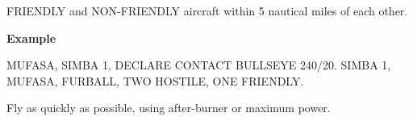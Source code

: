 \begin{tcoloritemize}
    \blueitem[FURBALL]
    FRIENDLY and NON-FRIENDLY aircraft within 5 nautical miles of each other.

    \medskip
    \textbf{Example}
    \begin{center}
        \begin{minipage}{0.9\textwidth}
            MUFASA, SIMBA 1, DECLARE CONTACT BULLSEYE 240/20.
            SIMBA 1, MUFASA, FURBALL, TWO HOSTILE, ONE FRIENDLY.
        \end{minipage}
    \end{center}

    \blueitem[GATE]
    Fly as quickly as possible, using after-burner or
    maximum power.


\end{tcoloritemize}
